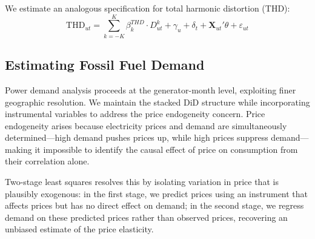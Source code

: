 \documentclass[a4paper,fleqn,longmktitle]{cas-sc}
\newcommand{\nb}[1]{\textcolor{blue}{NB[#1]}}
\theoremstyle{plain}
\theoremstyle{definition}
\begin{document}
We estimate an analogous specification for total harmonic distortion (THD):
\begin{equation}
\text{THD}_{ut} = \sum_{k=-K}^{K} \beta_k^{THD} \cdot D_{ut}^k + \gamma_u + \delta_t + \mathbf{X}_{ut}'\theta + \varepsilon_{ut}
\label{eq:thd_eventstudy}
\end{equation}


\subsection{Estimating Fossil Fuel Demand}

Power demand analysis proceeds at the generator-month level, exploiting finer geographic resolution. We maintain the stacked DiD structure while incorporating instrumental variables to address the price endogeneity concern. Price endogeneity arises because electricity prices and demand are simultaneously determined—high demand pushes prices up, while high prices suppress demand—making it impossible to identify the causal effect of price on consumption from their correlation alone.

Two-stage least squares resolves this by isolating variation in price that is plausibly exogenous: in the first stage, we predict prices using an instrument that affects prices but has no direct effect on demand; in the second stage, we regress demand on these predicted prices rather than observed prices, recovering an unbiased estimate of the price elasticity.

\end{document}
